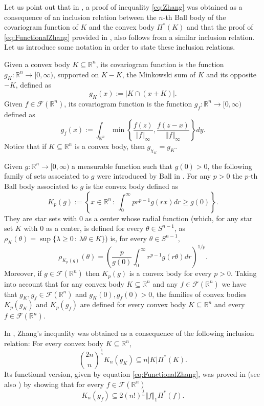 \documentclass{amsart}
\newcommand{\R}{\mathbb R}
\theoremstyle{remark}
\theoremstyle{definition}
\numberwithin{equation}{section}
\begin{document}
Let us point out that in \cite{GZ}, a proof of inequality \eqref{eq:Zhang} was obtained as a consequence of an inclusion relation between the $n$-th Ball body of the covariogram function of $K$ and the convex body $\Pi^*(K)$ and that the proof of \eqref{eq:FunctionalZhang} provided in \cite{ABG1}, also follows from a similar inclusion relation. Let us introduce some notation in order to state these inclusion relations.

Given a convex body $K\subseteq\R^n$, its covariogram function is the function $g_K:\R^n\to[0,\infty)$, supported on $K-K$, the Minkowski sum of $K$ and its opposite $-K$, defined as
$$
g_K(x):=|K\cap(x+K)|.
$$
Given $f\in\mathcal{F}(\R^n)$, its covariogram function is the function $g_f:\R^n\to[0,\infty)$ defined as
$$
g_f(x):=\int_{\R^n}\min\left\{\frac{f(z)}{\Vert f\Vert_\infty},\frac{f(z-x)}{\Vert f\Vert_\infty}\right\}dy.
$$
Notice that if $K\subseteq\R^n$ is a convex body, then $g_{\chi_K}=g_K$.

Given $g:\R^n\to[0,\infty)$ a measurable function such that $g(0)>0$, the following family of sets associated to $g$ were introduced by Ball in \cite{Ba}. For any $p>0$ the $p$-th Ball body associated to $g$ is the convex body defined as
$$
K_p(g):=\left\{x\in\R^n\,:\,\int_0^\infty pr^{p-1}g(rx)dr\geq g(0)\right\}.
$$
They are star sets with $0$ as a center whose radial function (which, for any star set $K$ with $0$ as a center, is defined for every $\theta\in S^{n-1}$, as $\rho_K(\theta)=\sup\{\lambda\geq 0\,:\,\lambda\theta\in K\}$) is, for every $\theta\in S^{n-1}$,
$$
\rho_{K_p(g)}(\theta)=\left(\frac{p}{g(0)}\int_0^\infty r^{p-1}g(r\theta)dr\right)^{1/p}.
$$
Moreover, if $g\in\mathcal{F}(\R^n)$ then $K_p(g)$ is a convex body for every $p>0$. Taking into account that for any convex body $K\subseteq\R^n$ and any $f\in\mathcal{F}(\R^n)$ we have that $g_K, g_f\in\mathcal{F}(\R^n)$ and $g_K(0), g_f(0)>0$, the families of convex bodies $K_p(g_K)$ and $K_p(g_f)$ are defined for every convex body $K\subseteq\R^n$ and every $f\in\mathcal{F}(\R^n)$.

In \cite{GZ}, Zhang's inequality was obtained  as a consequence of the following inclusion relation: For every convex body $K\subseteq\R^n$,
\begin{equation}\label{eq:InclusionZhang}
{\binom{2n}{n}}^\frac{1}{n}K_n(g_K)\subseteq n|K|\Pi^*(K).
\end{equation}
Its functional version, given by equation \eqref{eq:FunctionalZhang}, was proved in \cite{ABG1} (see also \cite{ABG2}) by showing that for every $f\in\mathcal{F}(\R^n)$
\begin{equation}\label{eq:InclusionFunctionalZhang}
K_n(g_f)\subseteq 2(n!)^\frac{1}{n}\Vert f\Vert_1\Pi^*(f).
\end{equation}
\end{document}
